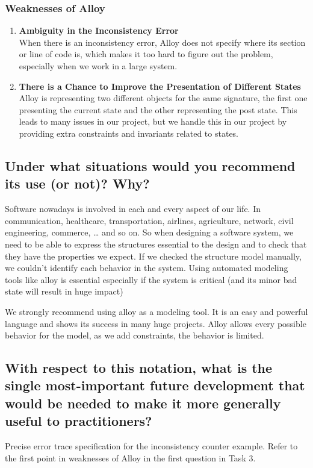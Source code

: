 \documentclass[titlepage]{article}
\begin{document}
\subsubsection{Weaknesses of Alloy}
\begin{enumerate}
	\item \textbf{Ambiguity in the Inconsistency Error} \\
	When there is an inconsistency error, Alloy does not specify where its section or line of code is, which makes it too hard to figure out the problem, especially when we work in a large system.
	\item \textbf{There is a Chance to Improve the Presentation of Different States} \\
	Alloy is representing two different objects for the same signature, the first one presenting the current state and the other representing the post state. This leads to many issues in our project, but we handle this in our project by providing extra constraints and invariants related to states.
\end{enumerate}
\subsection{Under what situations would you recommend its use (or not)? Why?}
Software nowadays is involved in each and every aspect of our life. In communication, healthcare, transportation, airlines, agriculture, network, civil engineering, commerce, … and so on. So when designing a software system, we need to be able to express the structures essential to the design and to check that they have the properties we expect. If we checked the structure model manually, we couldn’t identify each behavior in the system. Using automated modeling tools like alloy is essential especially if the system is critical (and its minor bad state will result in huge impact)

We strongly recommend using alloy as a modeling tool. It is an easy and powerful language and shows its success in many huge projects. Alloy allows every possible behavior for the model, as we add constraints, the behavior is limited.

\subsection{With respect to this notation, what is the single most-important future development that would be needed to
	make it more generally useful to practitioners?}

	Precise error trace specification for the inconsistency counter example. Refer to the first point in weaknesses of Alloy in the first question in Task 3.
\end{document}
